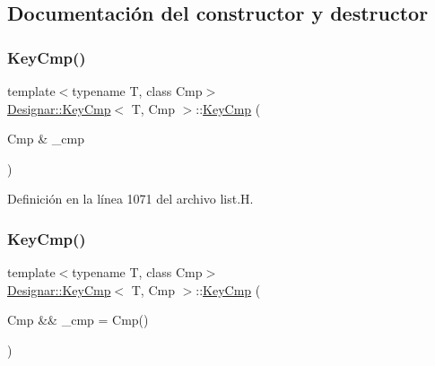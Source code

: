 \subsection{Documentación del constructor y destructor}
\mbox{\label{struct_designar_1_1_key_cmp_a8addea491666ad6d859113f8a03597c7}} 
\subsubsection{\texorpdfstring{Key\+Cmp()}{KeyCmp()}\hspace{0.1cm}{\footnotesize\ttfamily [1/2]}}
{\footnotesize\ttfamily template$<$typename T, class Cmp$>$ \\
\hyperlink{struct_designar_1_1_key_cmp}{Designar\+::\+Key\+Cmp}$<$ T, Cmp $>$\+::\hyperlink{struct_designar_1_1_key_cmp}{Key\+Cmp} (\begin{DoxyParamCaption}\item[{Cmp \&}]{\+\_\+cmp }\end{DoxyParamCaption})\hspace{0.3cm}{\ttfamily [inline]}}



Definición en la línea 1071 del archivo list.\+H.

\mbox{\label{struct_designar_1_1_key_cmp_a9e5e19bf38ff54d6c3dad828ceb63cd2}} 
\subsubsection{\texorpdfstring{Key\+Cmp()}{KeyCmp()}\hspace{0.1cm}{\footnotesize\ttfamily [2/2]}}
{\footnotesize\ttfamily template$<$typename T, class Cmp$>$ \\
\hyperlink{struct_designar_1_1_key_cmp}{Designar\+::\+Key\+Cmp}$<$ T, Cmp $>$\+::\hyperlink{struct_designar_1_1_key_cmp}{Key\+Cmp} (\begin{DoxyParamCaption}\item[{Cmp \&\&}]{\+\_\+cmp = {\ttfamily Cmp()} }\end{DoxyParamCaption})\hspace{0.3cm}{\ttfamily [inline]}}



